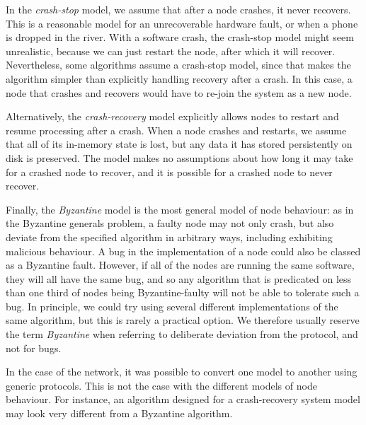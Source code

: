 In the \emph{crash-stop} model, we assume that after a node crashes, it never recovers.
This is a reasonable model for an unrecoverable hardware fault, or when a phone is dropped in the river.
With a software crash, the crash-stop model might seem unrealistic, because we can just restart the node, after which it will recover.
Nevertheless, some algorithms assume a crash-stop model, since that makes the algorithm simpler than explicitly handling recovery after a crash.
In this case, a node that crashes and recovers would have to re-join the system as a new node.

Alternatively, the \emph{crash-recovery} model explicitly allows nodes to restart and resume processing after a crash.
When a node crashes and restarts, we assume that all of its in-memory state is lost, but any data it has stored persistently on disk is preserved.
The model makes no assumptions about how long it may take for a crashed node to recover, and it is possible for a crashed node to never recover.

Finally, the \emph{Byzantine} model is the most general model of node behaviour: as in the Byzantine generals problem, a faulty node may not only crash, but also deviate from the specified algorithm in arbitrary ways, including exhibiting malicious behaviour.
A bug in the implementation of a node could also be classed as a Byzantine fault.
However, if all of the nodes are running the same software, they will all have the same bug, and so any algorithm that is predicated on less than one third of nodes being Byzantine-faulty will not be able to tolerate such a bug.
In principle, we could try using several different implementations of the same algorithm, but this is rarely a practical option.
We therefore usually reserve the term \emph{Byzantine} when referring to deliberate deviation from the protocol, and not for bugs.

In the case of the network, it was possible to convert one model to another using generic protocols.
This is not the case with the different models of node behaviour.
For instance, an algorithm designed for a crash-recovery system model may look very different from a Byzantine algorithm.


